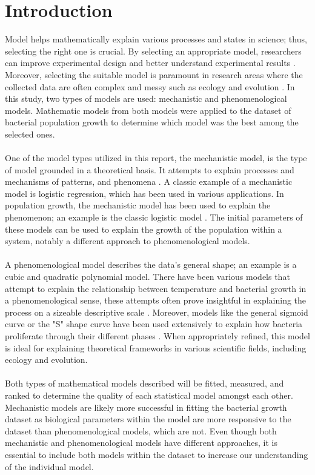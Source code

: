 \documentclass[11pt]{article}
\begin{document}
  \section{Introduction}
  \noindent  Model helps mathematically explain various processes and states in science; thus, selecting the right one is crucial.
  By selecting an appropriate model, researchers can improve experimental design and better understand experimental results \cite{motulsky2004fitting}.
  Moreover, selecting the suitable model is paramount in research areas where the collected data are often complex and messy such as ecology and evolution \cite{johnson2004model}.
  In this study, two types of models are used: mechanistic and phenomenological models.
  Mathematic models from both models were applied to the dataset of bacterial population growth to determine which model was the best among the selected ones.
  \\
  \\
  One of the model types utilized in this report, the mechanistic model, is the type of model grounded in a theoretical basis.
  It attempts to explain processes and mechanisms of patterns, and phenomena \cite{mhasoba_multilingual_2022}.
  A classic example of a mechanistic model is logistic regression, which has been used in various applications.
  In population growth, the mechanistic model has been used to explain the phenomenon; an example is the classic logistic model \cite{stefan2012mathematical}.
  The initial parameters of these models can be used to explain the growth of the population within a system, notably a different approach to phenomenological models.
  \\
  \\
  A phenomenological model describes the data's general shape; an example is a cubic and quadratic polynomial model.
  There have been various models that attempt to explain the relationship between temperature and bacterial growth in a phenomenological sense,
  these attempts often prove insightful in explaining the process on a sizeable descriptive scale \cite{heitzer1991utility}.
  Moreover, models like the general sigmoid curve or the "S" shape curve have been used extensively to explain how bacteria proliferate through their different phases \cite{longhi2017microbial}. 
  When appropriately refined, this model is ideal for explaining theoretical frameworks in various scientific fields, including ecology and evolution.
  \\
  \\
  Both types of mathematical models described will be fitted, measured, and ranked to determine the quality of each statistical model amongst each other.
  Mechanistic models are likely more successful in fitting the bacterial growth dataset as biological parameters within the model are more responsive to the dataset than phenomenological models, which are not.
  Even though both mechanistic and phenomenological models have different approaches, it is essential to include both models within the dataset to increase our understanding of the individual model.
  
\end{document}

